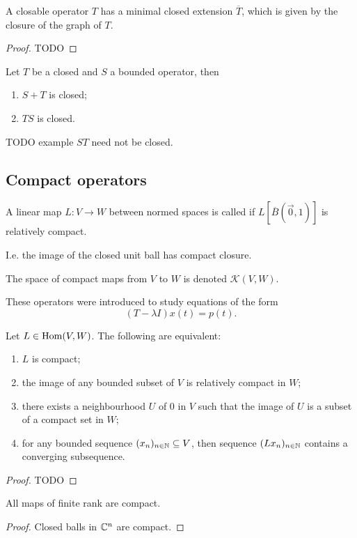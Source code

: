 \begin{lemma}
A closable operator $T$ has a minimal closed extension $\overline{T}$, which is given by the closure of the graph of $T$.
\end{lemma}
\begin{proof}
TODO
\end{proof}

\begin{proposition}
Let $T$ be a closed and $S$ a bounded operator, then
\begin{enumerate}
\item $S+T$ is closed;
\item $TS$ is closed.
\end{enumerate}
\end{proposition}
TODO example $ST$ need not be closed.

\subsection{Compact operators}
\begin{definition}
A linear map $L:V\to W$ between normed spaces is called  if $L[\overline{B}(\vec{0}, 1)]$ is relatively compact.

I.e. the image of the closed unit ball has compact closure.

The space of compact maps from $V$ to $W$ is denoted $\mathcal{K}(V,W)$.
\end{definition}

These operators were introduced to study equations of the form
\[ (T-\lambda I)x(t) = p(t). \]

\begin{proposition}
Let $L\in\operatorname{Hom}(V,W)$. The following are equivalent:
\begin{enumerate}
\item $L$ is compact;
\item the image of any bounded subset of $V$ is relatively compact in $W$;
\item there exists a neighbourhood $U$ of $0$ in $V$ such that the image of $U$ is a subset of a compact set in $W$;
\item for any bounded sequence $(x_n)_{n\in\mathbb{N}} \subseteq V$, then sequence $(Lx_n)_{n\in\mathbb{N}}$ contains a converging subsequence.
\end{enumerate}
\end{proposition}
\begin{proof}
TODO
\end{proof}
\begin{corollary}
All maps of finite rank are compact.
\end{corollary}
\begin{proof}
Closed balls in $\mathbb{C}^n$ are compact.
\end{proof}

